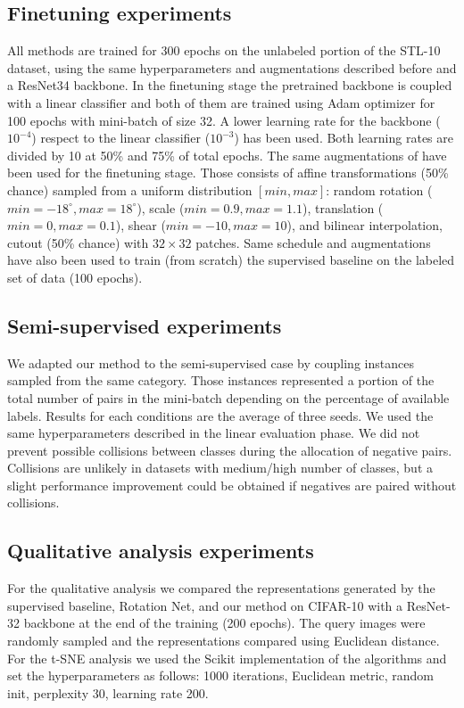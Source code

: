 \documentclass{article}
\begin{document}
\subsection{Finetuning experiments}\label{appendix:implementation_finetuning}

All methods are trained for 300 epochs on the unlabeled portion of the STL-10 dataset, using the same hyperparameters and augmentations described before and a ResNet34 backbone. In the finetuning stage the pretrained backbone is coupled with a linear classifier and both of them are trained using Adam optimizer for 100 epochs with mini-batch of size 32. A lower learning rate for the backbone ($10^{-4}$) respect to the linear classifier ($10^{-3}$) has been used. Both learning rates are divided by 10 at 50\% and 75\% of total epochs. The same augmentations of \cite{ji2019invariant} have been used for the finetuning stage. Those consists of affine transformations (50\% chance) sampled from a uniform distribution $[min, max]$: random rotation ($min=-18^{\circ}, max=18^{\circ}$), scale ($min=0.9, max=1.1$), translation ($min=0, max=0.1$), shear ($min=-10, max=10$), and bilinear interpolation, cutout (50\% chance) with $32\times32$ patches. Same schedule and augmentations have also been used to train (from scratch) the supervised baseline on the labeled set of data (100 epochs).


\subsection{Semi-supervised experiments}

We adapted our method to the semi-supervised case by coupling instances sampled from the same category. Those instances represented a portion of the total number of pairs in the mini-batch depending on the percentage of available labels.
Results for each conditions are the average of three seeds. We used the same hyperparameters described in the linear evaluation phase.
We did not prevent possible collisions between classes during the allocation of negative pairs. Collisions are unlikely in datasets with medium/high number of classes, but a slight performance improvement could be obtained if negatives are paired without collisions. 

\subsection{Qualitative analysis experiments}

For the qualitative analysis we compared the representations generated by the supervised baseline, Rotation Net, and our method on CIFAR-10 with a ResNet-32 backbone at the end of the training (200 epochs). The query images were randomly sampled and the representations compared using Euclidean distance.
For the t-SNE analysis we used the Scikit implementation of the algorithms and set the hyperparameters as follows: 1000 iterations, Euclidean metric, random init, perplexity 30, learning rate 200. 
\end{document}
